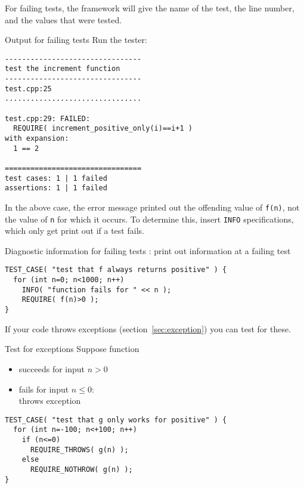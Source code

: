 For failing tests, the framework will give
the name of the test, the line number,
and the values that were tested.

\begin{block}{Output for failing tests}
  \label{sl:catch-fail}
  \small
  Run the tester:
\begin{verbatim}
--------------------------------
test the increment function
--------------------------------
test.cpp:25
................................

test.cpp:29: FAILED:
  REQUIRE( increment_positive_only(i)==i+1 )
with expansion:
  1 == 2

================================
test cases: 1 | 1 failed
assertions: 1 | 1 failed
\end{verbatim}
\end{block}

In the above case, the error message
printed out the offending value of \lstinline+f(n)+,
not the value of \lstinline+n+ for which it occurs.
To determine this, insert \lstinline+INFO+ specifications,
which only get print out if a test fails.

\begin{block}{Diagnostic information for failing tests}
  \label{sl:catch-info}
  : print out information at a failing test
\begin{lstlisting}
TEST_CASE( "test that f always returns positive" ) {
  for (int n=0; n<1000; n++)
    INFO( "function fails for " << n );
    REQUIRE( f(n)>0 );  
}  
\end{lstlisting}
\end{block}

If your code throws exceptions (section~\ref{sec:exception})
you can test for these.

\begin{block}{Test for exceptions}
  \label{sl:catch-case-throw}
Suppose function 
\begin{itemize}
\item succeeds for input $n>0$
\item fails for input $n\leq 0$:\\ throws exception
\end{itemize}

\begin{lstlisting}
TEST_CASE( "test that g only works for positive" ) {
  for (int n=-100; n<+100; n++)
    if (n<=0)
      REQUIRE_THROWS( g(n) );  
    else
      REQUIRE_NOTHROW( g(n) );  
}
\end{lstlisting}
\end{block}

